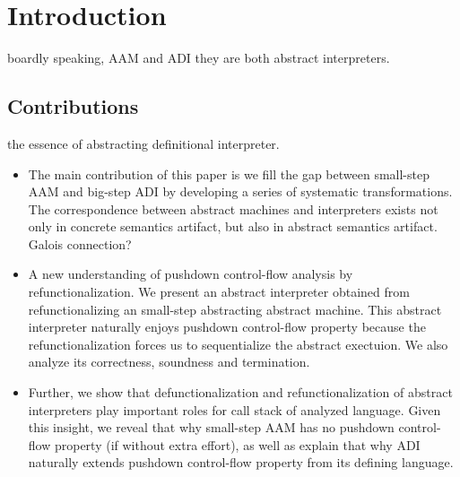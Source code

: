 \documentclass[acmsmall,review,anonymous]{acmart}\settopmatter{printfolios=true,printccs=false,printacmref=false}
\begin{document}




\maketitle

\section{Introduction}

boardly speaking, AAM and ADI they are both abstract interpreters.

\subsection{Contributions}

the essence of abstracting definitional interpreter.

\begin{itemize}
\item The main contribution of this paper is we fill the gap
  between small-step AAM and big-step ADI by developing a series of
  systematic transformations. 
  The correspondence between abstract
  machines and interpreters exists not only in concrete semantics artifact,
  but also in abstract semantics artifact.
  Galois connection?

\item A new understanding of pushdown control-flow analysis by 
  refunctionalization.
  We present an abstract interpreter obtained from refunctionalizing
  an small-step abstracting abstract machine. 
  This abstract interpreter naturally enjoys pushdown control-flow property
  because the refunctionalization forces us to sequentialize the 
  abstract exectuion.
  We also analyze its correctness, soundness and termination.

\item Further, we show that defunctionalization and refunctionalization
  of abstract interpreters play important roles for call stack of analyzed language.
  Given this insight, we reveal that why small-step AAM has no pushdown
  control-flow property (if without extra effort), as well as explain
  that why ADI naturally extends pushdown control-flow property from its
  defining language.

\end{itemize}
\end{document}
